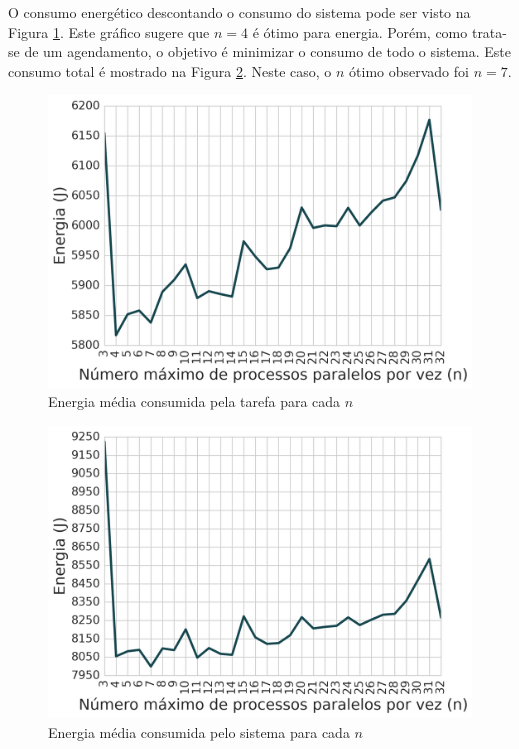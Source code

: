 O consumo energético descontando o consumo do sistema pode ser visto na Figura \ref{fig:agendamento_meanenergy}. Este gráfico sugere que $ n = 4 $ é ótimo para energia. Porém, como trata-se de um agendamento, o objetivo é minimizar o consumo de todo o sistema. Este consumo total é mostrado na Figura \ref{fig:agendamento_totenergy}. Neste caso, o $ n $ ótimo observado foi $ n = 7 $.

\begin{figure}[htp]
\centering
\includegraphics[scale=0.70]{figuras/Exper/AgendProc/meanenergy.png}
\caption{Energia média consumida pela tarefa para cada $ n $ }
\label{fig:agendamento_meanenergy}
\end{figure}

\begin{figure}[htp]
\centering
\includegraphics[scale=0.70]{figuras/Exper/AgendProc/meantotenergy.png}
\caption{Energia média consumida pelo sistema para cada $ n $ }
\label{fig:agendamento_totenergy}
\end{figure}


